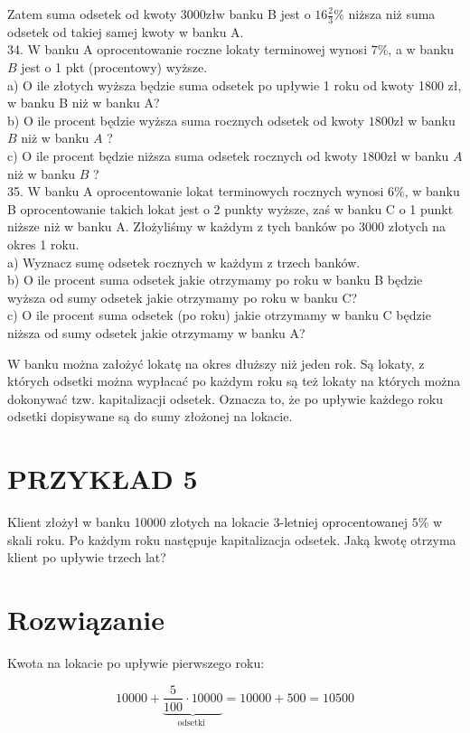 \documentclass[10pt]{article}
\begin{document}
Zatem suma odsetek od kwoty \(3000 \mathrm{zł} \mathrm{w}\) banku B jest o \(16 \frac{2}{3} \%\) niższa niż suma odsetek od takiej samej kwoty w banku A.\\
34. W banku A oprocentowanie roczne lokaty terminowej wynosi \(7 \%\), a w banku \(B\) jest o 1 pkt (procentowy) wyższe.\\
a) O ile złotych wyższa będzie suma odsetek po upływie 1 roku od kwoty 1800 zł, w banku B niż w banku A?\\
b) O ile procent będzie wyższa suma rocznych odsetek od kwoty \(1800 \mathrm{zł}\) w banku \(B\) niż w banku \(A\) ?\\
c) O ile procent będzie niższa suma odsetek rocznych od kwoty \(1800 \mathrm{zł}\) w banku \(A\) niż w banku \(B\) ?\\
35. W banku A oprocentowanie lokat terminowych rocznych wynosi \(6 \%\), w banku B oprocentowanie takich lokat jest o 2 punkty wyższe, zaś w banku C o 1 punkt niższe niż w banku A. Złożyliśmy w każdym z tych banków po 3000 złotych na okres 1 roku.\\
a) Wyznacz sumę odsetek rocznych w każdym z trzech banków.\\
b) O ile procent suma odsetek jakie otrzymamy po roku w banku B będzie wyższa od sumy odsetek jakie otrzymamy po roku w banku C?\\
c) O ile procent suma odsetek (po roku) jakie otrzymamy w banku C będzie niższa od sumy odsetek jakie otrzymamy w banku A?

W banku można założyć lokatę na okres dłuższy niż jeden rok. Są lokaty, z których odsetki można wypłacać po każdym roku są też lokaty na których można dokonywać tzw. kapitalizacji odsetek. Oznacza to, że po upływie każdego roku odsetki dopisywane są do sumy złożonej na lokacie.

\section*{PRZYKŁAD 5}
Klient złożył w banku 10000 złotych na lokacie 3-letniej oprocentowanej \(5 \%\) w skali roku. Po każdym roku następuje kapitalizacja odsetek. Jaką kwotę otrzyma klient po upływie trzech lat?

\section*{Rozwiązanie}
Kwota na lokacie po upływie pierwszego roku:

\[
10000+\underbrace{\frac{5}{100} \cdot 10000}_{\text {odsetki }}=10000+500=10500
\]
\end{document}
